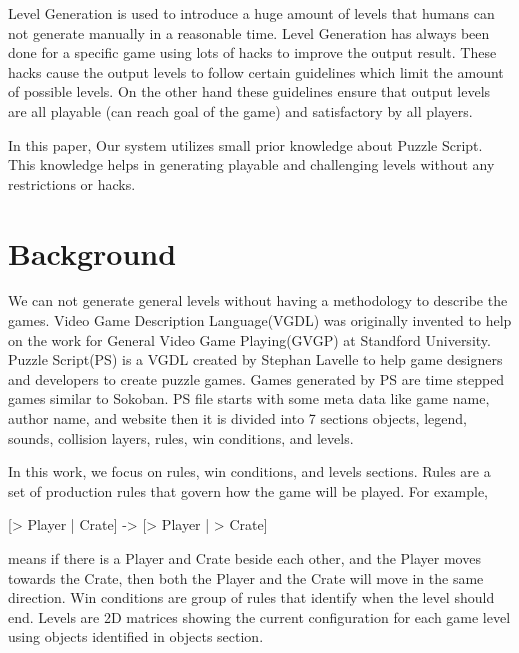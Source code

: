 \documentclass[letterpaper]{article}
\begin{document}
Level Generation is used to introduce a huge amount of levels that humans can not generate manually in a reasonable time. Level Generation has always been done for a specific game using lots of hacks to improve the output result. These hacks cause the output levels to follow certain guidelines which limit the amount of possible levels. On the other hand these guidelines ensure that output levels are all playable (can reach goal of the game) and satisfactory by all players\cite{mcGenerateEverything}.\\\par

In this paper, Our system utilizes small prior knowledge about Puzzle Script. This knowledge helps in generating playable and challenging levels without any restrictions or hacks.

\section{Background}
We can not generate general levels without having a methodology to describe the games. Video Game Description Language(VGDL) was originally invented to help on the work for General Video Game Playing(GVGP)\cite{gvgp} at Standford University. Puzzle Script(PS) is a VGDL created by Stephan Lavelle to help game designers and developers to create puzzle games\cite{puzzleScript}. Games generated by PS are time stepped games similar to Sokoban\cite{sokoban}. PS file starts with some meta data like game name, author name, and website then it is divided into 7 sections objects, legend, sounds, collision layers, rules, win conditions, and levels.\\\par

In this work, we focus on rules, win conditions, and levels sections. Rules are a set of production rules that govern how the game will be played. For example, \begin{center}[> Player | Crate] -> [> Player | > Crate]\end{center} means if there is a Player and Crate beside each other, and the Player moves towards the Crate, then both the Player and the Crate will move in the same direction. Win conditions are group of rules that identify when the level should end. Levels are 2D matrices showing the current configuration for each game level using objects identified in objects section.
\end{document}
